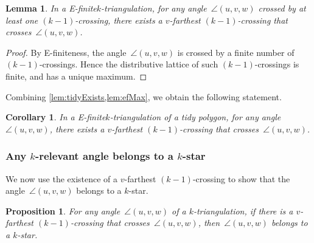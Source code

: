\documentclass{amsart}
\newtheorem{proposition}[theorem]{Proposition}
\newtheorem{lemma}[theorem]{Lemma}
\newtheorem{corollary}[theorem]{Corollary}
\theoremstyle{remark}
\newcommand*{\ef}[0]{E-finite\xspace}
\newcommand*{\ktg}[0]{$k$-triangulation\xspace}
\begin{document}
\begin{lemma}
\label{lem:efMax}
In a \ef \ktg, for any angle~$\angle(u,v,w)$ crossed by at least one $(k-1)$-crossing, there exists a $v$-farthest $(k-1)$-crossing that crosses~$\angle(u,v,w)$.
\end{lemma}

\begin{proof}
By \ef{}ness, the angle~$\angle(u,v,w)$ is crossed by a finite number of $(k-1)$-crossings. Hence the distributive lattice of such $(k-1)$-crossings is finite, and has a unique maximum.
\end{proof}

Combining \cref{lem:tidyExists,lem:efMax}, we obtain the following statement.

\begin{corollary}
\label{coro:farthestTidy}
In a \ef \ktg of a tidy polygon, for any angle~$\angle(u,v,w)$, there exists a $v$-farthest $(k-1)$-crossing that crosses~$\angle(u,v,w)$.
\end{corollary}


\subsubsection{Any $k$-relevant angle belongs to a $k$-star}

We now use the existence of a $v$-farthest $(k-1)$-crossing to show that the angle~$\angle(u,v,w)$ belongs to a $k$-star.

\begin{proposition}
\label{prop:angleBelongStar}
For any angle~$\angle(u,v,w)$ of a \ktg, if there is a $v$-farthest $(k-1)$-crossing that crosses~$\angle(u,v,w)$, then~$\angle(u,v,w)$ belongs to a $k$-star.
\end{proposition}
\end{document}
